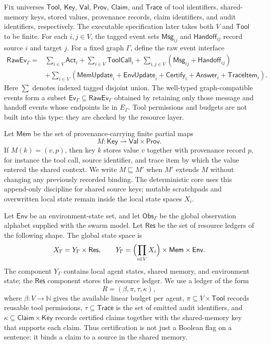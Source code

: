 \documentclass[a4paper,fleqn]{cas-sc}
\newcommand{\Obs}{\mathsf{Obs}}
\newcommand{\Act}{\mathsf{Act}}
\newcommand{\Msg}{\mathsf{Msg}}
\newcommand{\Tool}{\mathsf{Tool}}
\newcommand{\Mem}{\mathsf{Mem}}
\newcommand{\Env}{\mathsf{Env}}
\newcommand{\Res}{\mathsf{Res}}
\newcommand{\Trace}{\mathsf{Trace}}
\newcommand{\Ev}{\mathsf{Ev}}
\newcommand{\RawEv}{\mathsf{RawEv}}
\newcommand{\Handoff}{\mathsf{Handoff}}
\newcommand{\Claim}{\mathsf{Claim}}
\newcommand{\Key}{\mathsf{Key}}
\newcommand{\Val}{\mathsf{Val}}
\newcommand{\Prov}{\mathsf{Prov}}
\newcommand{\Nat}{\mathbb{N}}
\begin{document}
Fix universes \(\Tool\), \(\Key\), \(\Val\), \(\Prov\), \(\Claim\), and
\(\Trace\) of tool identifiers, shared-memory keys, stored values, provenance
records, claim identifiers, and audit identifiers, respectively. The
executable specification later takes both \(V\) and \(\Tool\) to be finite.
For each \(i,j\in V\), the tagged event sets
\(\Msg_{ij}\) and \(\Handoff_{ij}\) record source \(i\) and target \(j\).
For a fixed graph \(\Gamma\), define the raw event interface
\[
\begin{aligned}
  \RawEv_{\Gamma}={}&
  \sum_{i\in V}\Act_i
  +\sum_{i\in V}\mathsf{ToolCall}_i
  +\sum_{i,j\in V}(\Msg_{ij}+\Handoff_{ij}) \\
  &+\sum_{i\in V}(\mathsf{MemUpdate}_i+\mathsf{EnvUpdate}_i
  +\mathsf{Certify}_i+\mathsf{Answer}_i+\mathsf{TraceItem}_i).
\end{aligned}
\]
Here \(\sum\) denotes indexed tagged disjoint union. The well-typed
graph-compatible events form a subset \(\Ev_{\Gamma}\subseteq\RawEv_{\Gamma}\)
obtained by retaining only those message and handoff events whose endpoints
lie in \(E_{\Gamma}\). Tool permissions and budgets are not built into this
type: they are checked by the resource layer.

Let \(\Mem\) be the set of provenance-carrying finite partial maps
\[
  M:\Key\rightharpoonup \Val\times\Prov.
\]
If \(M(k)=(v,p)\), then key \(k\) stores value \(v\) together with provenance record \(p\), for instance the tool call, source identifier, and trace item by which the value entered the shared context. We write \(M\sqsubseteq M'\) when \(M'\) extends \(M\) without changing any previously recorded binding. The deterministic core uses this append-only discipline for shared source keys; mutable scratchpads and overwritten local state remain inside the local state spaces \(X_i\).

Let \(\Env\) be an environment-state set, and let \(\Obs_{\Gamma}\) be the
global observation alphabet supplied with the swarm model. Let \(\Res\) be
the set of resource ledgers of the following shape. The global state space is
\[
  X_{\Gamma}=Y_{\Gamma}\times\Res,
  \qquad
  Y_{\Gamma}=\Bigl(\prod_{i\in V}X_i\Bigr)\times \Mem\times\Env.
\]
The component \(Y_{\Gamma}\) contains local agent states, shared memory, and environment state; the \(\Res\) component stores the resource ledger. We use a ledger of the form
\[
  R=(\beta,\pi,\tau,\kappa),
\]
where \(\beta:V\to\Nat\) gives the available linear budget per agent, \(\pi\subseteq V\times\Tool\) records reusable tool permissions, \(\tau\subseteq\Trace\) is the set of emitted audit identifiers, and \(\kappa\subseteq\Claim\times\Key\) records certified claims together with the shared-memory key that supports each claim. Thus certification is not just a Boolean flag on a sentence: it binds a claim to a source in the shared memory.
\end{document}
